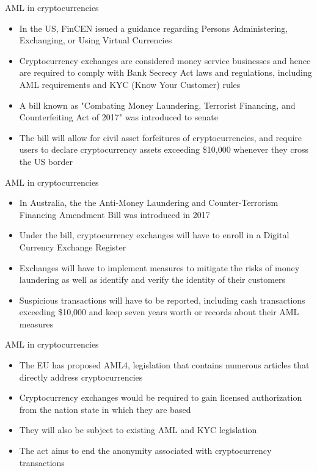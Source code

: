 \documentclass[9pt]{beamer}
\begin{document}
\begin{frame}{AML in cryptocurrencies}
	\begin{itemize}
		\item In the US, FinCEN issued a guidance regarding Persons Administering, Exchanging, or Using Virtual Currencies
		\item Cryptocurrency exchanges are considered money service businesses and hence are required to comply with Bank Secrecy Act laws and regulations, including AML requirements and KYC (Know Your Customer) rules
		\item A bill known as "Combating Money Laundering, Terrorist Financing, and Counterfeiting Act of 2017" was introduced to senate
		\item The bill will allow for civil asset forfeitures of cryptocurrencies, and require users to declare cryptocurrency assets exceeding \$10,000 whenever they cross the US border
	\end{itemize}
\end{frame}


\begin{frame}{AML in cryptocurrencies}
	\begin{itemize}
		\item In Australia, the the Anti-Money Laundering and Counter-Terrorism Financing Amendment Bill was introduced in 2017
		\item Under the bill, cryptocurrency exchanges will have to enroll in a Digital Currency Exchange Register
		\item Exchanges will have to implement measures to mitigate the risks of money laundering as well as identify and verify the identity of their customers
		\item Suspicious transactions will have to be reported, including cash transactions exceeding \$10,000 and keep seven years worth or records about their AML measures
	\end{itemize}
\end{frame}


\begin{frame}{AML in cryptocurrencies}
	\begin{itemize}
		\item The EU has proposed AML4, legislation that contains numerous articles that directly address cryptocurrencies
		\item Cryptocurrency exchanges would be required to gain licensed authorization from the nation state in which they are based
		\item They will also be subject to existing AML and KYC legislation
		\item The act aims to end the anonymity associated with cryptocurrency transactions
	\end{itemize}
\end{frame}
\end{document}
